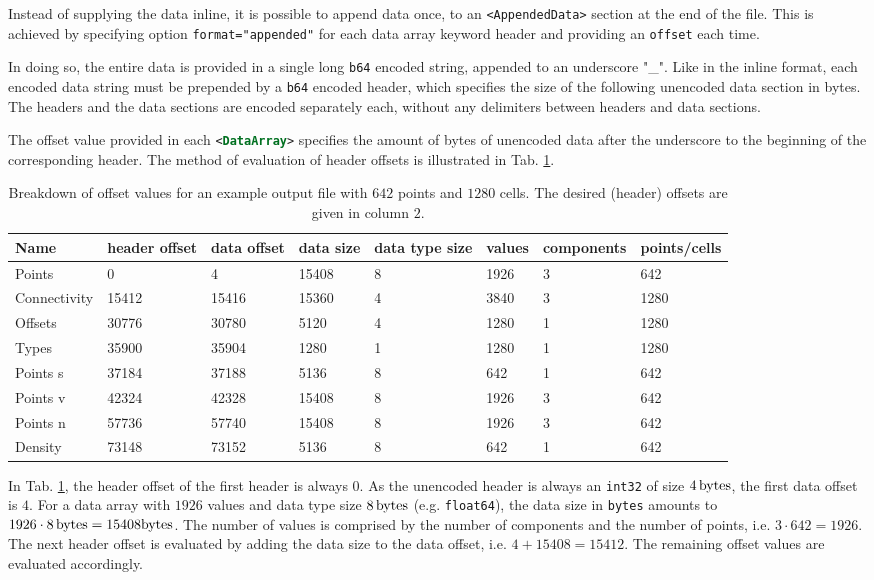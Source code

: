 \bigbreak
Instead of supplying the data inline, it is possible to append data once, to an \lstinline{<AppendedData>} section at the end of the file. This is achieved by specifying option \lstinline[language=XML]{format="appended"} for each data array keyword header and providing an \lstinline[language=XML]{offset} each time.

\bigbreak
In doing so, the entire data is provided in a single long \texttt{b64} encoded string, appended to an underscore "\_". Like in the inline format, each encoded data string must be prepended by a \texttt{b64} encoded header, which specifies the size of the following unencoded data section in bytes. The headers and the data sections are encoded separately each, without any delimiters between headers and data sections.

\bigbreak
The offset value provided in each \lstinline[language=XML]{<DataArray>} specifies the amount of bytes of unencoded data after the underscore to the beginning of the corresponding header. The method of evaluation of header offsets is illustrated in Tab. \ref{tab:offset}.

\begin{table}[t]
  \caption{Breakdown of offset values for an example output file with $642$ points and $1280$ cells. The desired (header) offsets are given in column $2$.}
  \begin{tabular}{@{}llllllll@{}}
    Name & header offset & data offset & data size & data type size & values & components & points/cells \\\midrule
    Points & 0 & 4 & 15408 & 8 & 1926 & 3 & 642\\
    Connectivity & 15412 & 15416 & 15360 & 4 & 3840 & 3 & 1280\\
    Offsets & 30776 & 30780 & 5120 & 4 & 1280 & 1 & 1280\\
    Types & 35900 & 35904 & 1280 & 1 & 1280 & 1 & 1280\\
    Points s & 37184 & 37188 & 5136 & 8 & 642 & 1 & 642\\
    Points v & 42324 & 42328 & 15408 & 8 & 1926 & 3 & 642\\
    Points n & 57736 & 57740 & 15408 & 8 & 1926 & 3 & 642\\
    Density & 73148 & 73152 & 5136 & 8 & 642 & 1 & 642\\\bottomrule
  \end{tabular}
  \label{tab:offset}
\end{table}

\bigbreak
In Tab. \ref{tab:offset}, the header offset of the first header is always $0$. As the unencoded header is always an \lstinline[language=C]{int32} of size $4\,{\rm bytes}$, the first data offset is $4$. For a data array with $1926$ values and data type size $8\,{\rm bytes}$ (e.g. \lstinline[language=C]{float64}), the data size in \lstinline[language=C]{bytes} amounts to $1926\cdot8\,{\rm bytes}=15408{\rm bytes}$. The number of values is comprised by the number of components and the number of points, i.e. $3\cdot642=1926$. The next header offset is evaluated by adding the data size to the data offset, i.e. $4+15408=15412$. The remaining offset values are evaluated accordingly.

